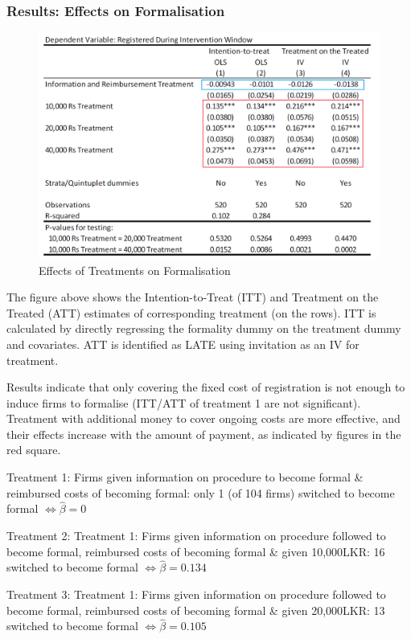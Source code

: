         \subsubsection{Results: Effects on Formalisation}
            \begin{figure}[H]
                \centering
                \includegraphics[width=5.5in]{images/ch5/SL formal treatment 2.png}
                \caption{Effects of Treatments on Formalisation}
            \end{figure}
            The figure above shows the Intention-to-Treat (ITT) and Treatment on the Treated (ATT) estimates of corresponding treatment (on the rows). ITT is calculated by directly regressing the formality dummy on the treatment dummy and covariates. ATT is identified as LATE using invitation as an IV for treatment.\par
            Results indicate that only covering the fixed cost of registration is not enough to induce firms to formalise (ITT/ATT of treatment 1 are not significant). Treatment with additional money to cover ongoing costs are more effective, and their effects increase with the amount of payment, as indicated by figures in the red square.
            
Treatment 1: Firms given information on procedure to become formal \& reimbursed costs of becoming formal: only 1 (of 104 firms) switched to become formal   $\Leftrightarrow\hat{\beta} = 0$

Treatment 2: Treatment 1: Firms given information on procedure followed to become formal, reimbursed costs of becoming formal \& given 10,000LKR: 16 switched to become formal $\Leftrightarrow\hat{\beta}= 0.134$

Treatment 3: Treatment 1: Firms given information on procedure followed to become formal, reimbursed costs of becoming formal \& given 20,000LKR: 13 switched to become formal   $\Leftrightarrow\hat{\beta}= 0.105$

